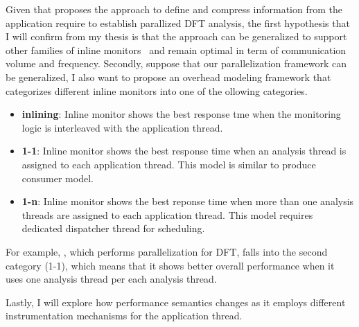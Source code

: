 %
%
Given that \sreplica proposes the approach to define and compress information
from the application require to establish parallized DFT analysis, the first
hypothesis that I will confirm from my thesis is that the approach can be
generalized to support other families of inline monitors~\cite{} and remain
optimal in term of communication volume and frequency.
%
Secondly, suppose that our parallelization framework can be generalized, I also
want to propose an overhead modeling framework that categorizes different inline
monitors into one of the ollowing categories.

\begin{itemize}

        \item {\bf inlining}: Inline monitor shows the best response tme when
                the monitoring logic is interleaved with the application
                thread.

        \item {\bf 1-1}: Inline monitor shows the best response time when an
                analysis thread is assigned to each application thread. This
                model is similar to produce consumer model.

        \item {\bf 1-n}: Inline monitor shows the best reponse time when more
                than one analysis threads are assigned to each application
                thread. This model requires dedicated dispatcher thread for
                scheduling.
\end{itemize}

For example, \sreplica, which performs parallelization for DFT, falls into the
second category (1-1), which means that it shows better overall performance
when it uses one analysis thread per each analysis thread. 

Lastly, I will explore how performance semantics changes as it employs
different instrumentation mechanisms for the application thread.

